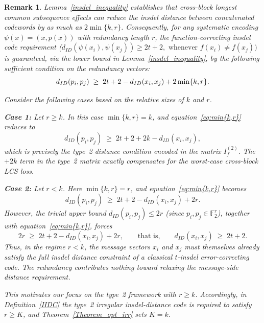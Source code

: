 \documentclass[11 pt]{article}
\numberwithin{equation}{section}
\newtheorem{remark}[theorem]{Remark}
\begin{document}
    

    \begin{remark}
    \label{rmk:redundancy-regime}
    Lemma~\ref{insdel_inequality} establishes that cross-block longest common subsequence effects can reduce the insdel distance between concatenated codewords by as much as $2\min\{k, r\}$. Consequently, for any systematic encoding $\psi(x) = (x, p(x))$ with redundancy length $r$, the function-correcting insdel code requirement ($d_{ID}(\psi(x_i), \psi(x_j)) \geq 2t + 2, \text{ whenever } f(x_i) \neq f(x_j))$ is guaranteed, via the lower bound in Lemma~\ref{insdel_inequality}, by the following sufficient condition on the redundancy vectors:
    \begin{equation}
    \label{eq:min{k,r}}
        d_{ID}(p_i, p_j) \;\geq\; 2t + 2 - 
    d_{ID}(x_i, x_j) + 2\min\{k, r\}. 
    \end{equation}

    \noindent Consider the following cases based on the relative sizes of $k$ and $r$.

    \smallskip
    \noindent\textbf{Case 1:} Let $r \geq k$. In this case $\min\{k, r\} = k$, and equation~\eqref{eq:min{k,r}} reduces to
    \[
    d_{ID}(p_i, p_j) \;\geq\; 2t + 2 + 2k - 
    d_{ID}(x_i, x_j),
    \]
    which is precisely the type~2 distance condition encoded in the matrix $I^{(2)}_f$. The $+2k$ term in the type~2 matrix exactly compensates for the worst-case cross-block LCS loss.

    \smallskip
    \noindent\textbf{Case 2: }Let $r < k$. Here $\min\{k, r\} = r$, and equation~\eqref{eq:min{k,r}} becomes
    \[
    d_{ID}(p_i, p_j) \;\geq\; 2t + 2 - 
    d_{ID}(x_i, x_j) + 2r.
    \]
    However, the trivial upper bound $d_{ID}(p_i, p_j) \leq 2r$ (since $p_i, p_j \in \mathbb{F}_2^{r}$), together with equation~\eqref{eq:min{k,r}}, forces
    \[
    2r \;\geq\; 2t + 2 - d_{ID}(x_i, x_j) + 2r,
    \qquad \text{that is,} \qquad 
    d_{ID}(x_i, x_j) \;\geq\; 2t + 2.
    \]
    Thus, in the regime $r < k$, the message vectors $x_i$ and $x_j$ must themselves already satisfy the full insdel distance constraint of a classical $t$-insdel error-correcting code. The redundancy contributes nothing toward relaxing the message-side distance requirement. 

    \smallskip
    This motivates our focus on the type~2 framework with $r \geq k$. Accordingly, in Definition~\ref{IIDC} the type~2 irregular insdel-distance code is required to satisfy $r \geq K$, and Theorem~\ref{Theorem_opt_irr} sets $K = k$.
    \end{remark}
    
\end{document}
